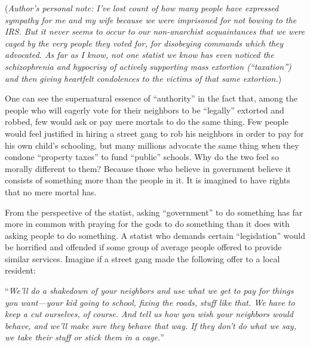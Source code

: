 \documentclass{book}
\begin{document}
(\emph{Author's personal note: I've lost count of how many people have expressed sympathy for me and my wife because we were imprisoned for not bowing to the IRS. But it never seems to occur to our non-anarchist acquaintances that we were caged by the very people they voted for, for disobeying commands which they advocated. As far as I know, not one statist we know has even noticed the schizophrenia and hypocrisy of actively supporting mass extortion (\enquote{taxation}) and then giving heartfelt condolences to the victims of that same extortion.})

One can see the supernatural essence of \enquote{authority} in the fact that, among the people who will eagerly vote for their neighbors to be \enquote{legally} extorted and robbed, few would ask or pay mere mortals to do the same thing. Few people would feel justified in hiring a street gang to rob his neighbors in order to pay for his own child's schooling, but many millions advocate the same thing when they condone \enquote{property taxes} to fund \enquote{public} schools. Why do the two feel so morally different to them? Because those who believe in government believe it consists of something more than the people in it. It is imagined to have rights that no mere mortal has.

From the perspective of the statist, asking \enquote{government} to do something has far more in common with praying for the gods to do something than it does with asking people to do something. A statist who demands certain \enquote{legislation} would be horrified and offended if some group of average people offered to provide similar services. Imagine if a street gang made the following offer to a local resident:

\enquote{\emph{We'll do a shakedown of your neighbors and use what we get to pay for things you want---your kid going to school, fixing the roads, stuff like that. We have to keep a cut ourselves, of course. And tell us how you wish your neighbors would behave, and we'll make sure they behave that way. If they don't do what we say, we take their stuff or stick them in a cage.}}
\end{document}

